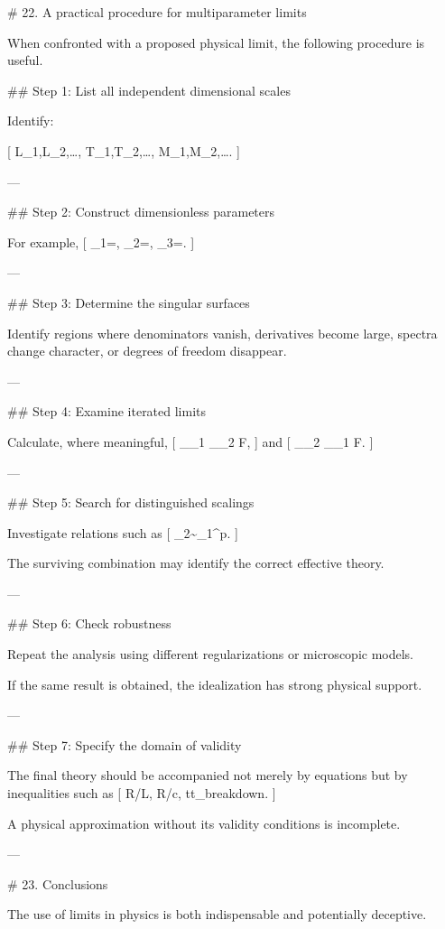 # 22. A practical procedure for multiparameter limits

When confronted with a proposed physical limit, the following procedure is useful.

## Step 1: List all independent dimensional scales

Identify:

[
L_1,L_2,\ldots,
\qquad
T_1,T_2,\ldots,
\qquad
M_1,M_2,\ldots.
]

---

## Step 2: Construct dimensionless parameters

For example,
[
\epsilon_1=,
\qquad
\epsilon_2=,
\qquad
\epsilon_3=.
]

---

## Step 3: Determine the singular surfaces

Identify regions where denominators vanish, derivatives become large, spectra change character, or degrees of freedom disappear.

---

## Step 4: Examine iterated limits

Calculate, where meaningful,
[
\lim_{\epsilon_1}
\lim_{\epsilon_2}
F,
]
and
[
\lim_{\epsilon_2}
\lim_{\epsilon_1}
F.
]

---

## Step 5: Search for distinguished scalings

Investigate relations such as
[
\epsilon_2\sim\epsilon_1^p.
]

The surviving combination may identify the correct effective theory.

---

## Step 6: Check robustness

Repeat the analysis using different regularizations or microscopic models.

If the same result is obtained, the idealization has strong physical support.

---

## Step 7: Specify the domain of validity

The final theory should be accompanied not merely by equations but by inequalities such as
[
R/L,
\qquad
\omega R/c,
\qquad
t\ll t_{\rm breakdown}.
]

A physical approximation without its validity conditions is incomplete.

---

# 23. Conclusions

The use of limits in physics is both indispensable and potentially deceptive.

